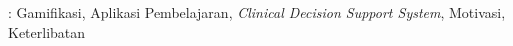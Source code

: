  : Gamifikasi, Aplikasi Pembelajaran, \textit{Clinical Decision Support System}, Motivasi, Keterlibatan

\vspace{1cm}









		

